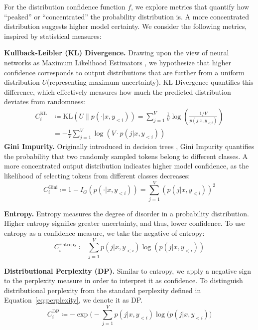 For the distribution confidence function $f$, we explore metrics that quantify how ``peaked'' or ``concentrated'' the probability distribution is. A more concentrated distribution suggests higher model certainty. We consider the following metrics, inspired by statistical measures:

\textbf{Kullback-Leibler (KL) Divergence.}
Drawing upon the view of neural networks as Maximum Likelihood Estimators \cite{lecun2015deep}, we hypothesize that higher confidence corresponds to output distributions that are further from a uniform distribution \(U\)(representing maximum uncertainty). KL Divergence quantifies this difference, which effectively measures how much the predicted distribution deviates from randomness:
\begin{equation}\label{eq:sc}
    \begin{split}
        C_i^{\text{KL}} &\coloneqq \mathrm{KL}(U\parallel p(\cdot|x,y_{<i})) =  \sum_{j=1}^{V} \frac{1}{V} \log\left(\frac{1/V}{p(j|x,y_{<i})}\right) \\
        &= -\frac{1}{V}\sum_{j=1}^{V} \log\left(V\cdot p(j|x,y_{<i})\right) 
    \end{split}
\end{equation}
\textbf{Gini Impurity.}
Originally introduced in decision trees \citep{breiman2017classification}, Gini Impurity quantifies the probability that two randomly sampled tokens belong to different classes. A more concentrated output distribution indicates higher model confidence, as the likelihood of selecting tokens from different classes decreases:
\begin{equation}
     C_i^{\text{Gini}}\coloneqq 1-I_G(p(\cdot|x,y_{<i})) = \sum_{j=1}^{V} (p(j|x,y_{<i}))^2 \nonumber 
\end{equation}

\textbf{Entropy.}
Entropy measures the degree of disorder in a probability distribution. Higher entropy signifies greater uncertainty, and thus, lower confidence. To use entropy as a confidence measure, we take the negative of entropy:
\begin{equation}
     C_i^{\text{Entropy}} \coloneqq \sum_{j=1}^{V} p(j|x,y_{<i}) \log(p(j|x,y_{<i})) \nonumber
\end{equation}

\textbf{Distributional Perplexity (DP).} 
Similar to entropy, we apply a negative sign to the perplexity measure in order to interpret it as confidence. To distinguish distributional perplexity from the standard perplexity defined in Equation~\ref{eq:perplexity}, we denote it as DP.
\begin{equation}
     C_i^{\text{DP}}\coloneqq -\exp{\bigg(-\sum_{j=1}^{V} p(j|x,y_{<i}) \log(p(j|x,y_{<i})\bigg)}\nonumber
\end{equation}


